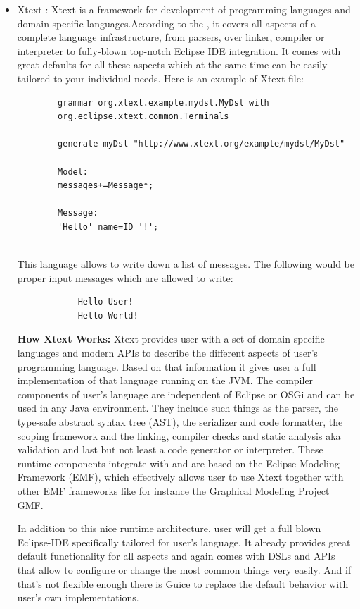 \begin{itemize}	
	\item Xtext : Xtext is a framework for development of programming languages and domain specific languages.According to the \cite{ref_17_xtext:grammar}, it covers all aspects of a complete language infrastructure, from parsers, over linker, compiler or interpreter to fully-blown top-notch Eclipse IDE integration. It comes with great defaults for all these aspects which at the same time can be easily tailored to your individual needs.
	Here is an example of Xtext file:
		\begin{lstlisting}
		grammar org.xtext.example.mydsl.MyDsl with 
		org.eclipse.xtext.common.Terminals
		
		generate myDsl "http://www.xtext.org/example/mydsl/MyDsl"
		
		Model:
		messages+=Message*;
		
		Message:
		'Hello' name=ID '!';
		
		\end{lstlisting}
		 
	This language allows to write down a list of messages. The following would be proper input messages which are allowed to write:
		\begin{lstlisting}
			Hello User!
			Hello World!		
		\end{lstlisting}
		
	\textbf{How Xtext Works:}
	Xtext provides user with a set of domain-specific languages and modern APIs to describe the different aspects of user's programming language. Based on that information it gives user a full implementation of that language running on the JVM. The compiler components of user's language are independent of Eclipse or OSGi and can be used in any Java environment. They include such things as the parser, the type-safe abstract syntax tree (AST), the serializer and code formatter, the scoping framework and the linking, compiler checks and static analysis aka validation and last but not least a code generator or interpreter. These runtime components integrate with and are based on the Eclipse Modeling Framework (EMF), which effectively allows user to use Xtext together with other EMF frameworks like for instance the Graphical Modeling Project GMF.
	
	In addition to this nice runtime architecture, user will get a full blown Eclipse-IDE specifically tailored for user's language. It already provides great default functionality for all aspects and again comes with DSLs and APIs that allow to configure or change the most common things very easily. And if that's not flexible enough there is Guice to replace the default behavior with user's own implementations.
	

\end{itemize}
